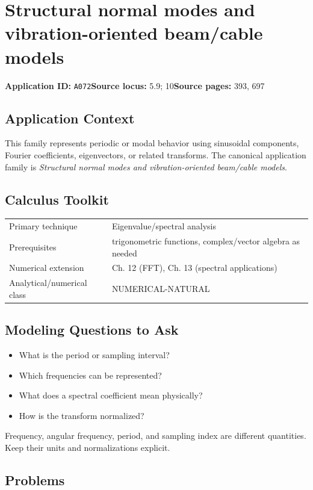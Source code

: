 \documentclass[11pt]{book}
\newcommand{\pid}[1]{\texttt{#1}}
\begin{document}
\chapter{Structural normal modes and vibration-oriented beam/cable models}\label{app:A072}
\textbf{Application ID:} \pid{A072}\quad \textbf{Source locus:} 5.9; 10\quad \textbf{Source pages:} 393, 697
\section*{Application Context}
This family represents periodic or modal behavior using sinusoidal components, Fourier coefficients, eigenvectors, or related transforms. The canonical application family is \emph{Structural normal modes and vibration-oriented beam/cable models}.
\section*{Calculus Toolkit}
\begin{tabularx}{\textwidth}{@{}lX@{}}\toprule
Primary technique & Eigenvalue/spectral analysis \\
Prerequisites & trigonometric functions, complex/vector algebra as needed \\
Numerical extension & Ch. 12 (FFT), Ch. 13 (spectral applications) \\
Analytical/numerical class & NUMERICAL-NATURAL \\
\bottomrule\end{tabularx}
\section*{Modeling Questions to Ask}\begin{itemize}
\item What is the period or sampling interval?
\item Which frequencies can be represented?
\item What does a spectral coefficient mean physically?
\item How is the transform normalized?
\end{itemize}
\begin{errorbox}Frequency, angular frequency, period, and sampling index are different quantities. Keep their units and normalizations explicit.\end{errorbox}
\section*{Problems}
\end{document}
